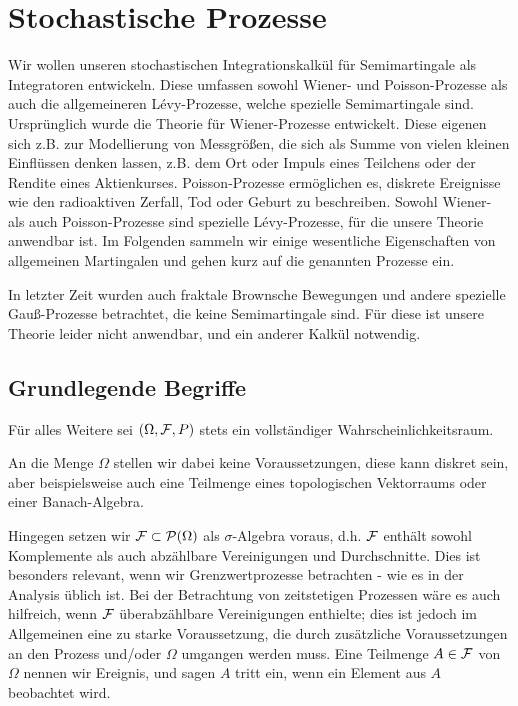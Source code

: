 \chapter{Stochastische Prozesse}

Wir wollen unseren stochastischen Integrationskalkül für
Semimartingale als Integratoren entwickeln. Diese umfassen sowohl Wiener- und
Poisson-Prozesse als auch die allgemeineren Lévy-Prozesse, welche
spezielle Semimartingale sind. Ursprünglich wurde die Theorie für
Wiener-Prozesse entwickelt.
Diese eigenen sich z.B. zur Modellierung von Messgrößen, die sich als Summe von
vielen kleinen Einflüssen denken lassen, z.B. dem Ort oder Impuls eines
Teilchens oder der Rendite eines Aktienkurses.
Poisson-Prozesse ermöglichen es, diskrete Ereignisse wie den radioaktiven
Zerfall, Tod oder Geburt zu beschreiben. Sowohl Wiener- als auch
Poisson-Prozesse sind spezielle Lévy-Prozesse, für die unsere Theorie anwendbar
ist. Im Folgenden sammeln wir einige wesentliche Eigenschaften von allgemeinen
Martingalen und gehen kurz auf die genannten Prozesse ein.

In letzter Zeit wurden auch fraktale Brownsche Bewegungen und andere spezielle
Gauß-Prozesse betrachtet, die keine Semimartingale sind. Für diese ist unsere
Theorie leider nicht anwendbar, und ein anderer Kalkül notwendig.

\section{Grundlegende Begriffe}

%
%
%

%
%
%

Für alles Weitere sei $(\Omega,\mathcal{F},P)$ stets ein vollständiger
Wahrscheinlichkeitsraum.

An die Menge $\Omega$ stellen wir dabei keine
Voraussetzungen, diese kann diskret sein, aber beispielsweise auch eine
Teilmenge eines topologischen Vektorraums oder einer Banach-Algebra.

Hingegen setzen wir $\mathcal{F}\subset\mathcal{P}(\Omega)$ als $\sigma$-Algebra voraus,
d.h. $\mathcal{F}$ enthält sowohl Komplemente als auch abzählbare Vereinigungen und
Durchschnitte. Dies ist besonders relevant, wenn wir Grenzwertprozesse
betrachten - wie es in der Analysis üblich ist. Bei der Betrachtung von
zeitstetigen Prozessen wäre es auch hilfreich, wenn $\mathcal{F}$ überabzählbare
Vereinigungen enthielte; dies ist jedoch im Allgemeinen eine zu starke
Voraussetzung, die durch zusätzliche Voraussetzungen an
den Prozess und/oder $\Omega$ umgangen werden muss.
Eine Teilmenge $A\in \mathcal{F}$ von $\Omega$ nennen wir Ereignis, und sagen
$A$ tritt ein, wenn ein Element aus $A$ beobachtet wird.

